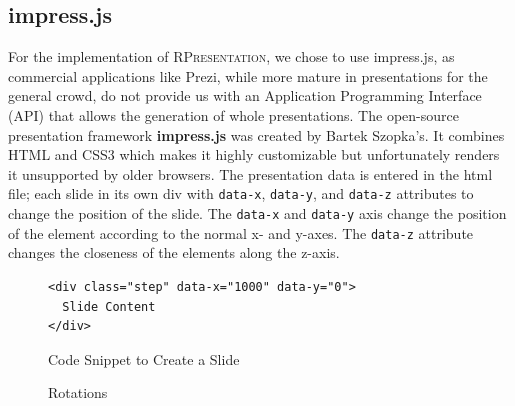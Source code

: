 \documentclass[twoside, 12pt]{article}
\newcommand{\sys}{\textsc{RPresentation}\xspace}
\begin{document}
\subsection{impress.js}
\label{sec:Impressjs}

For the implementation of \sys, we chose to use impress.js, as commercial applications like Prezi, while more mature in presentations for the general crowd, do not provide us with an Application Programming Interface (API) that allows the generation of whole presentations. The open-source presentation framework \textbf{impress.js} \cite{JSImpress:npentrel14} was created by Bartek Szopka's. It combines HTML and CSS3 which makes it highly customizable but unfortunately renders it unsupported by older browsers. The presentation data is entered in the html file; each slide in its own div with \texttt{data-x}, \texttt{data-y}, and \texttt{data-z} attributes to change the position of the slide. The \texttt{data-x} and \texttt{data-y} axis change the position of the element according to the normal x- and y-axes. The \texttt{data-z} attribute changes the closeness of the elements along the z-axis.\\

\begin{figure}
\vspace{-26pt}
\begin{verbatim}
<div class="step" data-x="1000" data-y="0">
  Slide Content
</div>
\end{verbatim}
\vspace{-5pt}
  \caption{Code Snippet to Create a Slide}
  \label{fig:SSlide}
  \vspace{12pt}
\end{figure}

\begin{figure}
\vspace{-26pt}
  \begin{center}
  \end{center}
\vspace{-20pt}
  \caption{Rotations \cite{Rotations:npentrel14}}
  \label{fig:Rotate}
\vspace{-10pt}
\end{figure}
\end{document}
